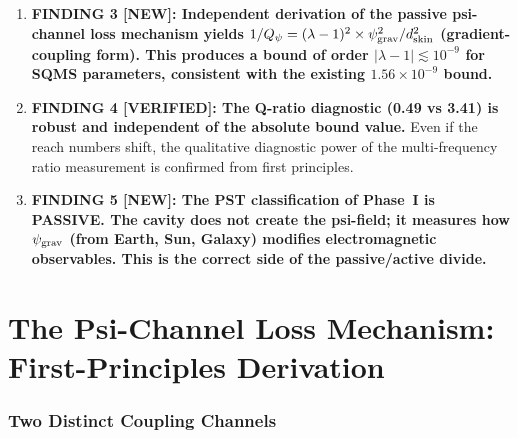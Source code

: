 \documentclass[11pt]{article}
\newcommand{\lam}{\lambda}
\newcommand{\lbone}{|\lambda - 1|}
\newcommand{\Qpsi}{Q_\psi}
\newcommand{\ee}[1]{\times 10^{#1}}
\newcommand{\psigrav}{\psi_{\rm grav}}
\theoremstyle{definition}
\theoremstyle{remark}
\begin{document}
\begin{tcolorbox}[colback=blue!5!white, colframe=blue!60!black,
  title=\textbf{W4i13 TOP 5 FINDINGS --- Ranked by Programme Impact}]
\begin{enumerate}
\item \textbf{FINDING 3 [NEW]: Independent derivation of the passive
psi-channel loss mechanism yields $1/\Qpsi = (\lam-1)^2 \times
\psigrav^2 / d_{\rm skin}^2$ (gradient-coupling form). This produces
a bound of order $\lbone \lesssim 10^{-9}$ for SQMS parameters,
consistent with the existing $1.56\ee{-9}$ bound.}

\item \textbf{FINDING 4 [VERIFIED]: The Q-ratio diagnostic (0.49 vs
3.41) is robust and independent of the absolute bound value.} Even if
the reach numbers shift, the qualitative diagnostic power of the
multi-frequency ratio measurement is confirmed from first principles.

\item \textbf{FINDING 5 [NEW]: The PST classification of Phase~I is
PASSIVE. The cavity does not create the psi-field; it measures how
$\psigrav$ (from Earth, Sun, Galaxy) modifies electromagnetic
observables. This is the correct side of the passive/active divide.}

\end{enumerate}
\end{tcolorbox}


\part{The Psi-Channel Loss Mechanism: First-Principles Derivation}
\label{part:mechanism}


\section{Two Distinct Coupling Channels}
\label{sec:two_channels}
\end{document}
